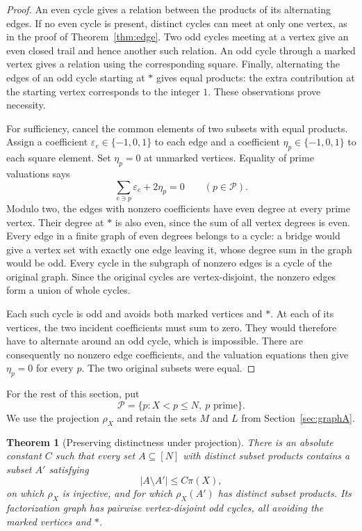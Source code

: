 \documentclass[11pt]{article}
\numberwithin{equation}{section}
\newtheorem{theorem}{Theorem}[section]
\theoremstyle{remark}
\newcommand{\eps}{\varepsilon}
\begin{document}
\begin{proof}
An even cycle gives a relation between the products of its alternating edges. If no even cycle is present, distinct cycles can meet at only one vertex, as in the proof of Theorem~\ref{thm:edge}. Two odd cycles meeting at a vertex give an even closed trail and hence another such relation. An odd cycle through a marked vertex gives a relation using the corresponding square. Finally, alternating the edges of an odd cycle starting at $*$ gives equal products: the extra contribution at the starting vertex corresponds to the integer $1$. These observations prove necessity.

For sufficiency, cancel the common elements of two subsets with equal products. Assign a coefficient $\eps_e\in\{-1,0,1\}$ to each edge and a coefficient $\eta_p\in\{-1,0,1\}$ to each square element. Set $\eta_p=0$ at unmarked vertices. Equality of prime valuations says
\[
\sum_{e\ni p}\eps_e+2\eta_p=0\qquad(p\in\mathcal P).
\]
Modulo two, the edges with nonzero coefficients have even degree at every prime vertex. Their degree at $*$ is also even, since the sum of all vertex degrees is even. Every edge in a finite graph of even degrees belongs to a cycle: a bridge would give a vertex set with exactly one edge leaving it, whose degree sum in the graph would be odd. Every cycle in the subgraph of nonzero edges is a cycle of the original graph. Since the original cycles are vertex-disjoint, the nonzero edges form a union of whole cycles.

Each such cycle is odd and avoids both marked vertices and $*$. At each of its vertices, the two incident coefficients must sum to zero. They would therefore have to alternate around an odd cycle, which is impossible. There are consequently no nonzero edge coefficients, and the valuation equations then give $\eta_p=0$ for every $p$. The two original subsets were equal.
\end{proof}

For the rest of this section, put
\[
\mathcal P=\{p:X<p\le N,\ p\text{ prime}\}.
\]
We use the projection $\rho_X$ and retain the sets $M$ and $L$ from Section~\ref{sec:graphA}.

\begin{theorem}[Preserving distinctness under projection]\label{thm:proj}
There is an absolute constant $C$ such that every set $A\subseteq[N]$ with distinct subset products contains a subset $A'$ satisfying
\[
|A\setminus A'|\le C\pi(X),
\]
on which $\rho_X$ is injective, and for which $\rho_X(A')$ has distinct subset products. Its factorization graph has pairwise vertex-disjoint odd cycles, all avoiding the marked vertices and $*$.
\end{theorem}
\end{document}
